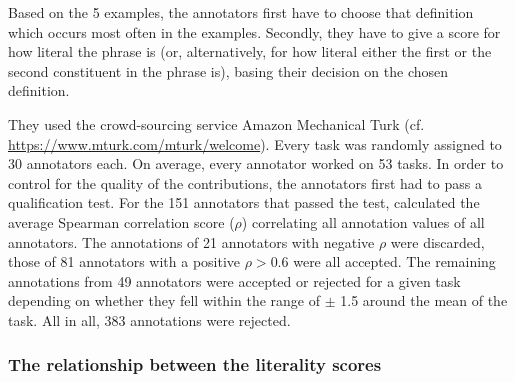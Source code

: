 




\noindent
Based on the 5 examples, the annotators first have to choose that definition which
occurs most often in the examples. Secondly, they have to give a
score for how literal the phrase is (or, alternatively, for how
literal either the first or the second constituent in the phrase is), basing their decision on the
chosen definition. 

They used the crowd-sourcing service Amazon
Mechanical Turk (cf. \linebreak[4] \url{https://www.mturk.com/mturk/welcome}).
Every task was randomly assigned to 30
annotators each. 
On average,
every annotator worked on 53 tasks. 
In order to control for the quality of the contributions, the annotators %
first had to pass a qualification test. For the 151 annotators that passed the test,
\citeauthor{Reddyetal:2011} calculated the average Spearman correlation score
($\rho$) correlating all annotation values of all annotators. The
annotations of 21 annotators %
with negative $\rho$ were discarded, those of 81 annotators with a positive $\rho >
0.6$ were all accepted. The remaining annotations from 49 annotators were
accepted or rejected for a given task depending on whether they fell
within the range of $\pm$ 1.5
around the mean of the task. All in all, 383 annotations were rejected. 



\subsubsection{The relationship between the literality scores}
\label{sec:inter-score-relations}


